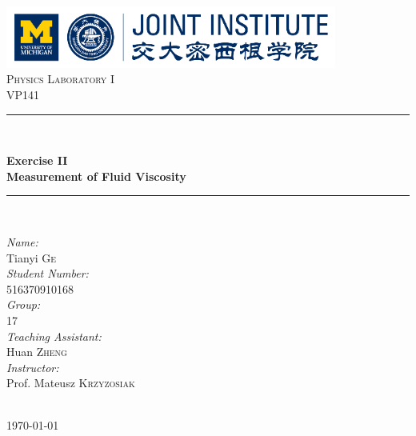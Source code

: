 \begin{titlepage}

\newcommand{\HRule}{\rule{\linewidth}{0.5mm}}

\center

\includegraphics[height=0.8in]{images/logo.png}\\[1cm]

\textsc{\Large Physics Laboratory I}\\[0.4cm]
\textsc{\large VP141}\\[0.4cm]

\HRule \\[0.4cm]
{
    \bfseries
    {\huge Exercise II}\\[0.3cm]
    {\large Measurement of Fluid Viscosity}\\[0.2cm]
    \HRule \\[1.5cm]
}

\begin{minipage}{0.4\textwidth}

\large
\emph{Name:}\\
Tianyi \textsc{Ge} \\

\emph{Student Number:}\\
516370910168 \\

\emph{Group:}\\
17\\

\emph{Teaching Assistant:}\\
Huan \textsc{Zheng}\\

\emph{Instructor:}\\
Prof. Mateusz \textsc{Krzyzosiak}

\end{minipage}\\[2cm]

{\large \today}\\[2cm]

\vfill

\end{titlepage}